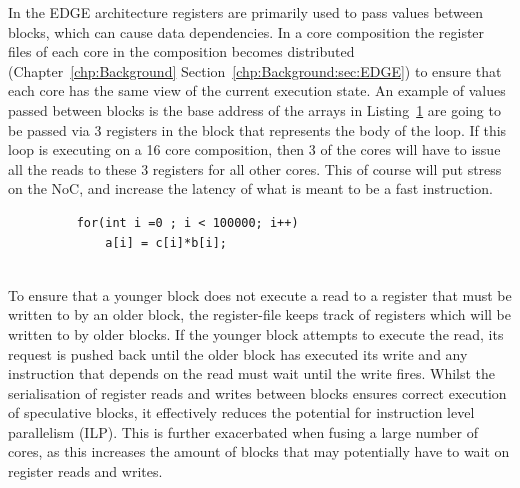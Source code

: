 In the EDGE architecture registers are primarily used to pass values between blocks, which can cause data dependencies.
In a core composition the register files of each core in the composition becomes distributed (Chapter~\ref{chp:Background} Section~\ref{chp:Background:sec:EDGE}) to ensure that each core has the same view of the current execution state.
An example of values passed between blocks is the base address of the arrays in Listing~\ref{lst:basic2} are going to be passed via 3 registers in the block that represents the body of the loop.
If this loop is executing on a 16 core composition, then 3 of the cores will have to issue all the reads to these 3 registers for all other cores.
This of course will put stress on the NoC, and increase the latency of what is meant to be a fast instruction.


\begin{figure}[t]
\lstset{language=C,numbersep=4pt}
\begin{center}
\begin{lstlisting}
	for(int i =0 ; i < 100000; i++)
		a[i] = c[i]*b[i];
	
\end{lstlisting}
\end{center}
\vspace{-1em}
\label{lst:basic2}
\vspace{1em}
\end{figure}

To ensure that a younger block does not execute a read to a register that must be written to by an older block, the register-file keeps track of registers which will be written to by older blocks.
If the younger block attempts to execute the read, its request is pushed back until the older block has executed its write and any instruction that depends on the read must wait until the write fires.
Whilst the serialisation of register reads and writes between blocks ensures correct execution of speculative blocks, it effectively reduces the potential for instruction level parallelism (ILP).
This is further exacerbated when fusing a large number of cores, as this increases the amount of blocks that may potentially have to wait on register reads and writes.

